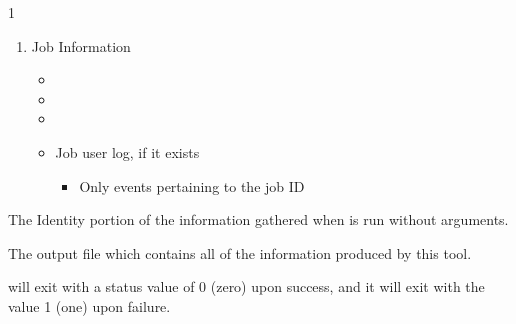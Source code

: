 \begin{ManPage}{\label{man-condor-gather-info}}{1}
\begin{enumerate}
\begin{itemize}
\begin{itemize}
                \item Definition locations for each configuration variable 
		  \end{itemize}
	\end{itemize}
	\item Job Information
	\begin{itemize}
    	\item {}
    	\item {}
    	\item {}
    	\item Job user log, if it exists
		\begin{itemize}
          	\item Only events pertaining to the job ID 
		\end{itemize}
	\end{itemize}
\end{enumerate}

\Files

\begin{description}
  \item{} The Identity portion of the information 
  gathered when  is run without arguments.
  \item{} The output file which contains all of 
  the information produced by this tool.
\end{description}

\ExitStatus

 will exit with a status value of 0 (zero) upon success,
and it will exit with the value 1 (one) upon failure.

\end{ManPage}
